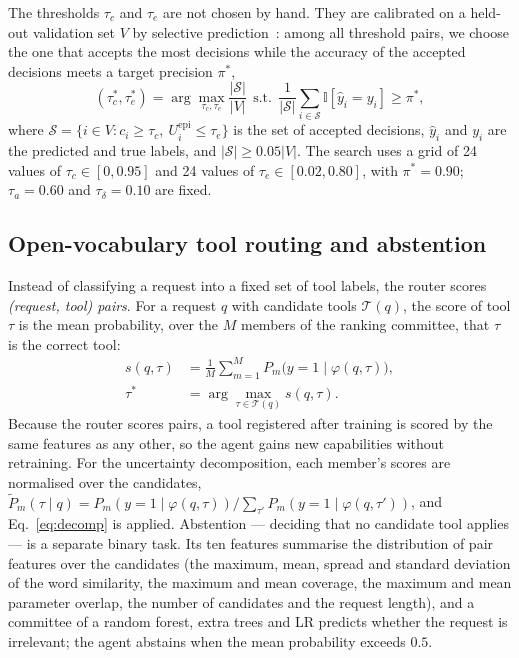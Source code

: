 \documentclass[journal]{IEEEtran}
\begin{document}
The thresholds $\tau_c$ and $\tau_e$ are not chosen by hand. They are
calibrated on a held-out validation set $V$ by selective
prediction~\cite{elyaniv2010selective,geifman2017selectivenet}: among all
threshold pairs, we choose the one that accepts the most decisions while the
accuracy of the accepted decisions meets a target precision $\pi^\ast$,
\begin{equation}
(\tau_c^\ast,\tau_e^\ast)=\arg\max_{\tau_c,\tau_e}\frac{|\mathcal{S}|}{|V|}
\ \ \text{s.t.}\ \ \frac{1}{|\mathcal{S}|}\sum_{i\in\mathcal{S}}\mathbb{I}[\hat{y}_i=y_i]\geq\pi^\ast,
\label{eq:calib}
\end{equation}
where $\mathcal{S}=\{i\in V: c_i\geq\tau_c,\ U^{\mathrm{epi}}_i\leq\tau_e\}$ is the
set of accepted decisions, $\hat{y}_i$ and $y_i$ are the predicted and true
labels, and $|\mathcal{S}|\geq0.05|V|$. The search uses a grid of 24 values of
$\tau_c\in[0,0.95]$ and 24 values of $\tau_e\in[0.02,0.80]$, with
$\pi^\ast=0.90$; $\tau_a=0.60$ and $\tau_\delta=0.10$ are fixed.

\subsection{Open-vocabulary tool routing and abstention}\label{sec:router}
Instead of classifying a request into a fixed set of tool labels, the router
scores \emph{(request, tool) pairs}. For a request $q$ with candidate tools
$\mathcal{T}(q)$, the score of tool $\tau$ is the mean probability, over the
$M$ members of the ranking committee, that $\tau$ is the correct tool:
\begin{equation}
\begin{aligned}
s(q,\tau)&=\frac{1}{M}\sum_{m=1}^{M}P_m\big(y=1\mid\varphi(q,\tau)\big),\\
\tau^\ast&=\arg\max_{\tau\in\mathcal{T}(q)}s(q,\tau).
\end{aligned}
\label{eq:route}
\end{equation}
Because the router scores pairs, a tool registered after training is scored
by the same features as any other, so the agent gains new capabilities without
retraining. For the uncertainty decomposition, each member's scores are
normalised over the candidates,
$\tilde{P}_m(\tau\mid q)=P_m(y=1\mid\varphi(q,\tau))/\sum_{\tau'}P_m(y=1\mid\varphi(q,\tau'))$,
and Eq.~\eqref{eq:decomp} is applied. Abstention --- deciding that no candidate
tool applies --- is a separate binary task. Its ten features summarise the
distribution of pair features over the candidates (the maximum, mean, spread
and standard deviation of the word similarity, the maximum and mean coverage,
the maximum and mean parameter overlap, the number of candidates and the
request length), and a committee of a random forest, extra trees and LR
predicts whether the request is irrelevant; the agent abstains when the mean
probability exceeds $0.5$.
\end{document}
